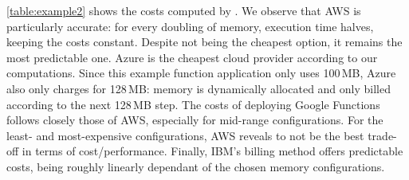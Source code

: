 \autoref{table:example2} shows the costs computed by \sys.
We observe that \gls{AWS} is particularly accurate: for every doubling of memory, execution time halves, keeping the costs constant.
Despite not being the cheapest option, it remains the most predictable one. 
Azure is the cheapest cloud provider according to our computations.
Since this example function application only uses 100\,\gls{MB}, Azure also only charges for 128\,\gls{MB}: memory is dynamically allocated and only billed according to the next 128\,MB step.
The costs of deploying Google Functions follows closely those of \gls{AWS}, especially for mid-range configurations.
For the least- and most-expensive configurations, AWS reveals to not be the best trade-off in terms of cost/performance.
Finally, IBM's billing method offers predictable costs, being roughly linearly dependant of the chosen memory configurations.
